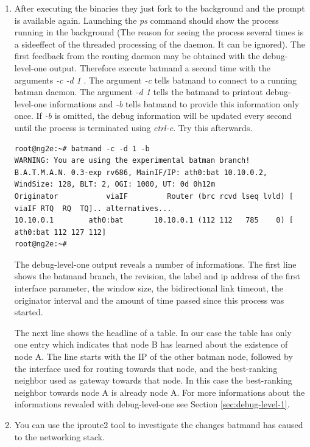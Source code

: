 \documentclass[11pt]{article}
\begin{document}
\begin{enumerate}
\item After executing the binaries they just fork to the background and the prompt is available again. 
Launching the \emph{ps} command should show the process running in the background (The reason for seeing the process several times is a sideeffect of the threaded processing of the daemon. It can be ignored). 
The first feedback from the routing daemon may be obtained with the debug-level-one output. 
Therefore execute batmand a second time with the arguments \emph{ -c -d 1 }. 
The argument \emph{-c} tells batmand to connect to a running batman daemon. 
The argument \emph{-d 1} tells the batmand to printout debug-level-one informations and 
\emph{-b} tells batmand to provide this information only once. 
If \emph{-b} is omitted, the debug information will be updated every second until the process is terminated using \emph{ctrl-c}.
Try this afterwards.

\begin{small} \begin{verbatim}
root@ng2e:~# batmand -c -d 1 -b
WARNING: You are using the experimental batman branch!
B.A.T.M.A.N. 0.3-exp rv686, MainIF/IP: ath0:bat 10.10.0.2, WindSize: 128, BLT: 2, OGI: 1000, UT: 0d 0h12m
Originator           viaIF         Router (brc rcvd lseq lvld) [    viaIF RTQ  RQ  TQ].. alternatives...
10.10.0.1        ath0:bat       10.10.0.1 (112 112   785    0) [ ath0:bat 112 127 112]
root@ng2e:~#
\end{verbatim} \end{small}

The debug-level-one output reveals a number of informations. The first line shows the batmand branch, the revision, the label and ip address of the first interface parameter, the window size, the bidirectional link timeout, the originator interval and the amount of time passed since this process was started. 

The next line shows the headline of a table. 
In our case the table has only one entry which indicates that node B has learned about the existence of node A.
The line starts with the IP of the other batman node, followed by the interface used for routing towards that node, and the best-ranking neighbor used as gateway towards that node. In this case the best-ranking neighbor towards node A is already node A.
For more informations about the informations revealed with debug-level-one see Section \ref{sec:debug-level-1}.

\item You can use the iproute2 tool to investigate the changes batmand has caused to the networking stack.


\end{enumerate}
\end{document}
